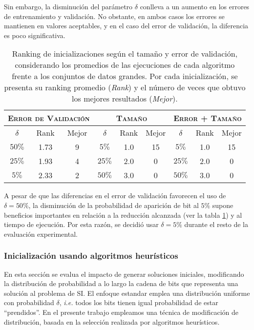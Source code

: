 Sin embargo, la disminución del parámetro $\delta$ conlleva a un aumento en los errores de entrenamiento y validación. No obstante, en ambos casos los errores se mantienen en valores aceptables, y en el caso del error de validación, la diferencia es poco significativa.

\begin{table}[h!]
\centering
\begin{tabular}{c c c|c c c|c c c}
\hline
\multicolumn{3}{c|}{\textsc{Error de Validación}}
	& \multicolumn{3}{c|}{\textsc{Tamaño}}
	& \multicolumn{3}{c}{\textsc{Error + Tamaño}} \\
\hline
$\delta$ & Rank & Mejor & $\delta$ & Rank & Mejor & $\delta$ & Rank & Mejor \\
\hline
\hline
$50\%$ & 1.73 & 9 & $5\%$  & 1.0 & 15 & $5\%$  & 1.0 & 15 \\
$25\%$ & 1.93 & 4 & $25\%$ & 2.0 &  0 & $25\%$ & 2.0 &  0 \\
$5\%$  & 2.33 & 2 & $50\%$ & 3.0 &  0 & $50\%$ & 3.0 &  0 \\
\hline
\end{tabular}
\caption[Ranking de probabilidad de bit $\delta$ según el tamaño y error de validación]{Ranking de inicializaciones según el tamaño y error de validación, considerando los promedios de las ejecuciones de cada algoritmo frente a los conjuntos de datos grandes. Por cada inicialización, se presenta su ranking promedio (\emph{Rank}) y el número de veces que obtuvo los mejores resultados (\emph{Mejor}).}
\label{table-unif-rank}
\end{table}

A pesar de que las diferencias en el error de validación favorecen el uso de\linebreak$\delta = 50\%$, la disminución de la probabilidad de aparición de bit al $5\%$ supone beneficios importantes en relación a la reducción alcanzada (ver la tabla \ref{table-unif-rank}) y al tiempo de ejecución. Por esta razón, se decidió usar $\delta = 5\%$ durante el resto de la evaluación experimental.

\subsubsection{Inicialización usando algoritmos heurísticos}

En esta sección se evalua el impacto de generar soluciones iniciales, modificando la distribución de probabilidad a lo largo la cadena de bits que representa una solución al problema de SI. El enfoque estandar emplea una distribución uniforme con probabilidad $\delta$, \emph{i.e.} todos los bits tienen igual probabilidad de estar ``prendidos''. En el presente trabajo empleamos una técnica de modificación de distribución, basada en la selección realizada por algoritmos heurísticos.

